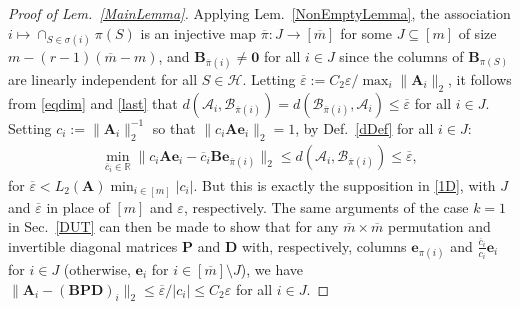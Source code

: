 \documentclass[journal, twocolumn]{IEEEtran}
\begin{document}
\begin{proof}[Proof of Lem.~\ref{MainLemma}]
Applying Lem.~\ref{NonEmptyLemma}, the association $i \mapsto \cap_{S \in \sigma(i)} \pi(S)$ is an injective map $\overline \pi: J \to [\overline m]$ for some $J \subseteq [m]$ of size $m - (r-1)(\overline m - m)$, and $\mathbf{B}_{\overline \pi(i)} \neq \mathbf{0}$ for all $i \in J$ since the columns of $\mathbf{B}_{\pi(S)}$ are linearly independent for all $S \in \mathcal{H}$. Letting $\overline \varepsilon := C_2 \varepsilon / \max_i \|\mathbf{A}_i\|_2$, it follows from \eqref{eqdim} and \eqref{last} that $d\left( \bm{\mathcal{A}}_i, \bm{\mathcal{B}}_{\overline \pi(i)} \right) = d\left(\bm{\mathcal{B}}_{\overline \pi(i)},  \bm{\mathcal{A}}_i \right)  \leq \overline \varepsilon$ for all $i \in J$. %
Setting $c_i := \|\mathbf{A}_i\|_2^{-1}$ so that $\|c_i\mathbf{Ae}_i\|_2 = 1$, by Def.~\ref{dDef} for all $i \in J$:
\begin{align*}
\min_{\overline c_i \in \mathbb{R}} \|c_i\mathbf{Ae}_i - \overline c_i \mathbf{Be}_{\overline \pi(i)} \|_2
\leq d\left( \bm{\mathcal{A}}_i, \bm{\mathcal{B}}_{\overline \pi(i)} \right)
\leq \overline \varepsilon,
\end{align*}
%
for $\overline \varepsilon < L_2(\mathbf{A})\min_{i \in [m]}|c_i|$. But this is exactly the supposition in \eqref{1D}, with $J$ and $\overline \varepsilon$ in place of $[m]$ and $\varepsilon$, respectively. The same arguments of the case $k=1$ in Sec.~\ref{DUT} can then be made to show that for any $\overline m \times \overline m$ permutation and invertible diagonal matrices $\mathbf{P}$ and $\mathbf{D}$ with, respectively, columns $\mathbf{e}_{\pi(i)}$ and $\frac{\overline{c}_i}{c_i}\mathbf{e}_i$ for $i \in J$ (otherwise, $\mathbf{e}_{i}$ for $i \in [\overline{m}] \setminus J$), we have $\|\mathbf{A}_i - (\mathbf{B}\mathbf{PD})_i \|_2 \leq \overline  \varepsilon / |c_i|  \leq C_2 \varepsilon$ for all $i \in J$.
\end{proof}
\end{document}
